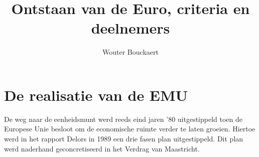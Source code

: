 \documentclass[a4paper]{article}
\begin{document}
\title{Ontstaan van de Euro, criteria en deelnemers}
\author{Wouter Bouckaert}
\maketitle

\section{De realisatie van de EMU}

De weg naar de eenheidsmunt werd reeds eind jaren '80 uitgestippeld
toen de Europese Unie besloot om de economische ruimte verder te
laten groeien. Hiertoe werd in het rapport Delors in 1989 een drie
fasen plan uitgestippeld. Dit plan werd naderhand geconcretiseerd in
het Verdrag van Maastricht.


\end{document}
